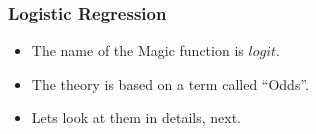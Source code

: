 \begin{frame}[fragile]\frametitle{Logistic Regression}
 \begin{itemize}
\item The name of the Magic function is $logit$.
\item The theory is based on a term called ``Odds''.
\item Lets look at them in details, next.
\end{itemize}

\end{frame}














